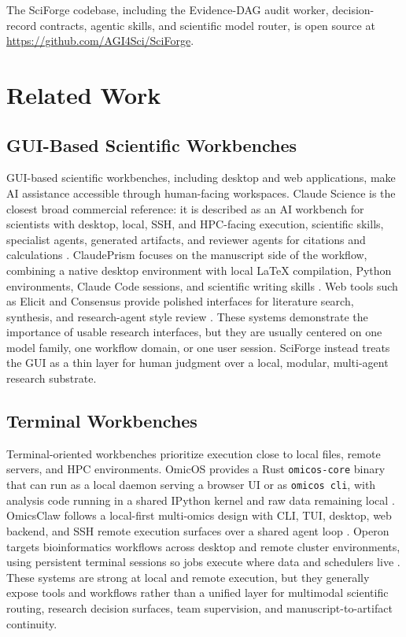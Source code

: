 \documentclass[sn-basic,Numbered,pdflatex]{sn-jnl}
\begin{document}
The SciForge codebase, including the Evidence-DAG audit worker, decision-record contracts, agentic skills, and scientific model router, is open source at \url{https://github.com/AGI4Sci/SciForge}.

\section{Related Work}

\subsection{GUI-Based Scientific Workbenches}

GUI-based scientific workbenches, including desktop and web applications, make AI assistance accessible through human-facing workspaces. Claude Science is the closest broad commercial reference: it is described as an AI workbench for scientists with desktop, local, SSH, and HPC-facing execution, scientific skills, specialist agents, generated artifacts, and reviewer agents for citations and calculations \cite{anthropicClaudeScience2026}. ClaudePrism focuses on the manuscript side of the workflow, combining a native desktop environment with local LaTeX compilation, Python environments, Claude Code sessions, and scientific writing skills \cite{claudePrism2026}. Web tools such as Elicit and Consensus provide polished interfaces for literature search, synthesis, and research-agent style review \cite{elicit2026,consensus2026}. These systems demonstrate the importance of usable research interfaces, but they are usually centered on one model family, one workflow domain, or one user session. SciForge instead treats the GUI as a thin layer for human judgment over a local, modular, multi-agent research substrate.

\subsection{Terminal Workbenches}

Terminal-oriented workbenches prioritize execution close to local files, remote servers, and HPC environments. OmicOS provides a Rust \texttt{omicos-core} binary that can run as a local daemon serving a browser UI or as \texttt{omicos cli}, with analysis code running in a shared IPython kernel and raw data remaining local \cite{omicOSOverview2026,omicOSServe2026,omicOSCLI2026}. OmicsClaw follows a local-first multi-omics design with CLI, TUI, desktop, web backend, and SSH remote execution surfaces over a shared agent loop \cite{omicsClaw2026}. Operon targets bioinformatics workflows across desktop and remote cluster environments, using persistent terminal sessions so jobs execute where data and schedulers live \cite{operonGitHub2026}. These systems are strong at local and remote execution, but they generally expose tools and workflows rather than a unified layer for multimodal scientific routing, research decision surfaces, team supervision, and manuscript-to-artifact continuity.
\end{document}
